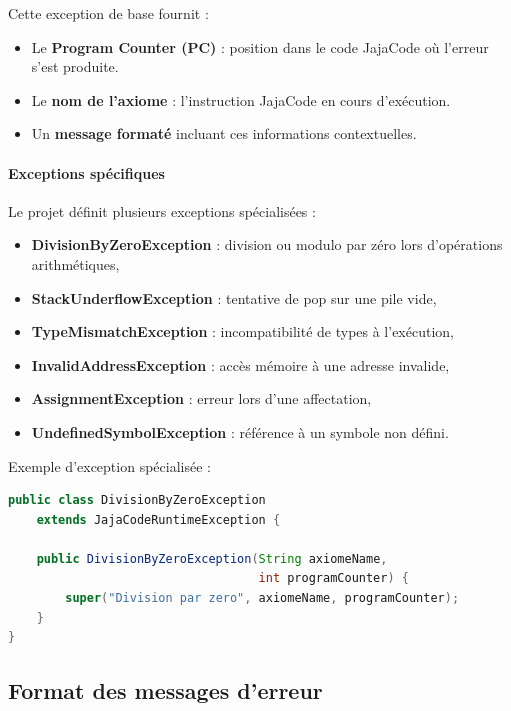 Cette exception de base fournit :
\begin{itemize}
    \item Le \textbf{Program Counter (PC)} : position dans le code JajaCode où l'erreur s'est produite.
    \item Le \textbf{nom de l'axiome} : l'instruction JajaCode en cours d'exécution.
    \item Un \textbf{message formaté} incluant ces informations contextuelles.
\end{itemize}

\paragraph{Exceptions spécifiques}

Le projet définit plusieurs exceptions spécialisées :

\begin{itemize}
    \item \textbf{DivisionByZeroException} : division ou modulo par zéro lors d'opérations arithmétiques,
    \item \textbf{StackUnderflowException} : tentative de pop sur une pile vide,
    \item \textbf{TypeMismatchException} : incompatibilité de types à l'exécution,
    \item \textbf{InvalidAddressException} : accès mémoire à une adresse invalide,
    \item \textbf{AssignmentException} : erreur lors d'une affectation,
    \item \textbf{UndefinedSymbolException} : référence à un symbole non défini.
\end{itemize}

Exemple d'exception spécialisée :
\vspace{0.3cm}
\begin{lstlisting}[language=java, caption=DivisionByZeroException,label={lst:divisionbyzero-exception}]
public class DivisionByZeroException
    extends JajaCodeRuntimeException {

    public DivisionByZeroException(String axiomeName,
                                   int programCounter) {
        super("Division par zero", axiomeName, programCounter);
    }
}
\end{lstlisting}

\subsection{Format des messages d'erreur}\label{subsec:format-des-messages-d'erreur}

